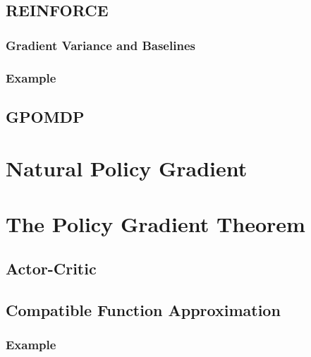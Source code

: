         \subsection{REINFORCE} %

            \subsubsection{Gradient Variance and Baselines} %

            \subsubsection{Example} %

        \subsection{GPOMDP} %

    \section{Natural Policy Gradient} %

    \section{The Policy Gradient Theorem} %

        \subsection{Actor-Critic} %

        \subsection{Compatible Function Approximation} %

            \subsubsection{Example} %

